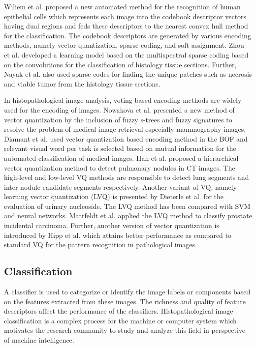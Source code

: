 \begin{itemize}
 Wiliem et al. \cite{wiliem2013classification} proposed a new automated method for the recognition of human epithelial cells which represents each image into the codebook descriptor vectors having dual regions and feds these descriptors to the nearest convex hull method for the classification. The codebook descriptors are generated by various encoding methods, namely vector quantization, sparse coding, and soft assignment.   Zhou et al. \cite{Zhou2014} developed a learning model based on the multispectral sparse coding based on the convolutions for the classification of histology tissue sections. Further, Nayak et al. \cite{nayak2013} also used sparse codes for finding the unique patches such as necrosis and viable tumor from the histology tissue sections.
 
In histopathological image analysis, voting-based encoding methods are widely used for the encoding of images. Nowakova et al. \cite{Nowakova2018} presented a new method of vector quantization by the inclusion of fuzzy s-trees and fuzzy signatures to resolve the problem of medical image retrieval especially mammography images. Diamant et al. \cite{Diamant2017} used vector quantization based encoding method in the BOF and relevant visual word per task is selected based on mutual information for the automated classification of medical images.  Han et al. \cite{Han2015} proposed a hierarchical vector quantization method to detect pulmonary nodules in CT images. The high-level and low-level VQ methods are responsible to detect lung segments and inter nodule candidate segments respectively.   Another variant of VQ, namely learning vector quantization (LVQ) is presented by Dieterle et al. \cite{Dieterle2003} for the evaluation of urinary nucleoside. The LVQ method has been compared with SVM and neural networks. Mattfeldt et al.  \cite{mattfeldt2004classification} applied the LVQ method to classify prostate incidental carcinoma. Further, another version of vector quantization is introduced by Hipp et al. \cite{Balis2011} which attains better performance as compared to standard VQ for the pattern recognition in pathological images. 

\end{itemize}


\subsection{Classification}\label{subsec:Classification}

A classifier is used to categorize or identify the image labels or components based on the features extracted from these images. The richness and quality of feature descriptors affect the performance of the classifiers. Histopathological image classification is a complex process for the machine or computer system which motivates the research community to study and analyze this field in perspective of machine intelligence. 


